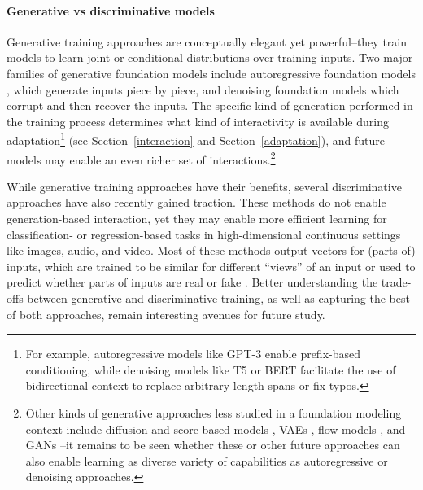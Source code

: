 \paragraph{Generative vs discriminative models} Generative training approaches are conceptually elegant yet powerful--they train models to learn joint or conditional distributions over training inputs. Two major families of generative foundation models include autoregressive foundation models \citep{Oord2016WaveNetAG, Radford2018ImprovingLU, chen2020imagegpt, Yang2019XLNetGA, ramesh2021zeroshot}, which generate inputs piece by piece, and denoising foundation models \citep{devlin2019bert, raffel2019exploring}  which corrupt and then recover the inputs. The specific kind of generation performed in the training process determines what kind of interactivity is available during adaptation\footnote{For example, autoregressive models like GPT-3 enable prefix-based conditioning, while denoising models like T5 or BERT facilitate the use of bidirectional context to replace arbitrary-length spans or fix typos.} (see Section~\ref{interaction} and Section~\ref{adaptation}), and future models may enable an even richer set  of interactions.\footnote{Other kinds of generative approaches less studied in a foundation modeling context include diffusion and score-based models \citep{SohlDickstein2015DeepUL, Song2019GenerativeMB, Ho2020DenoisingDP}, VAEs \citep{Kingma2014AutoEncodingVB}, flow models \citep{dinh2015nice, Kingma2018GlowGF}, and GANs \citep{goodfellow2014gan}--it remains to be seen whether these or other future approaches can also enable learning as diverse variety of capabilities as autoregressive or denoising approaches.}

While generative training approaches have their benefits, several discriminative approaches have also recently gained traction. These methods do not enable generation-based interaction, yet they may enable more efficient learning for classification- or regression-based tasks in high-dimensional continuous settings like images, audio, and video. Most of these methods output vectors for (parts of) inputs, which are trained to be similar for different ``views'' of an input \citep{Wu2018UnsupervisedFL, Oord2018RepresentationLW, chen2020simclr, He2020MomentumCF, Grill2020BootstrapYO, Caron2021EmergingPI, convirt, radford2021learning} or used to predict whether parts of inputs are real or fake \citep{Clark2020ELECTRAPT, Iida2021TABBIEPR}. Better understanding the trade-offs between generative and discriminative training, as well as capturing the best of both approaches, remain interesting avenues for future study.

